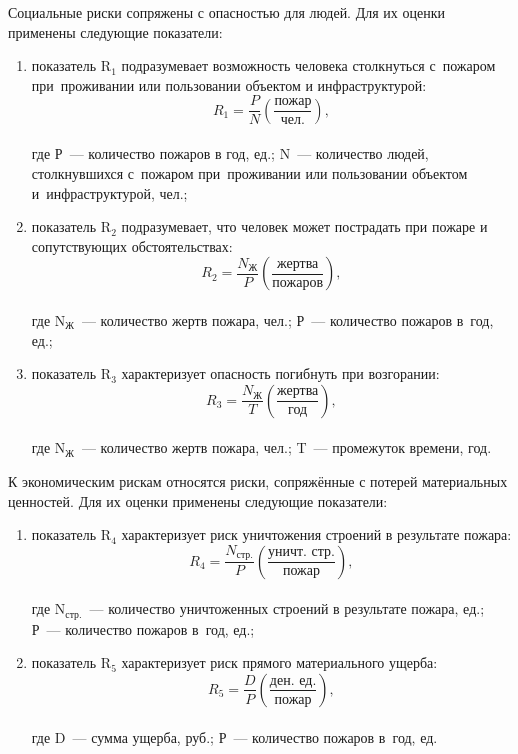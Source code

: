 Социальные риски сопряжены с опасностью для людей. Для их оценки применены следующие показатели:
\begin{enumerate}[noitemsep]\vspace{-8pt}
  \item показатель R$_1$ подразумевает возможность человека столкнуться с~пожаром при~проживании или пользовании объектом и инфраструктурой:\\
  $$R_{1}=\frac{P}{N}\left(\dfrac{\text{пожар}}{\text{чел.}}\right),$$\\
  где Р~--- количество пожаров в год, ед.; N~--- количество людей, столкнувшихся с~пожаром при~проживании или пользовании объектом и~инфраструктурой, чел.;
  \item показатель R$_2$ подразумевает, что человек может пострадать при пожаре и сопутствующих обстоятельствах:\\
  $$R_{2}=\frac{N_\text{Ж}}{P}\left(\dfrac{\text{жертва}}{\text{пожаров}}\right),$$\\
  где N$_\text{Ж}$~--- количество жертв пожара, чел.; Р~--- количество пожаров в~год, ед.;
  \item показатель R$_3$ характеризует опасность погибнуть при возгорании:\\
    $$R_{3}=\frac{N_\text{Ж}}{T}\left(\dfrac{\text{жертва}}{\text{год}}\right),$$\\
    где N$_\text{Ж}$~--- количество жертв пожара, чел.; T~--- промежуток времени, год.
\end{enumerate}
 \vspace{-8pt}
\clearpage
К экономическим рискам относятся риски, сопряжённые с потерей материальных ценностей. Для их оценки применены следующие показатели:
\begin{enumerate}[noitemsep]\vspace{-8pt}
  \item показатель R$_4$ характеризует риск уничтожения строений в результате пожара:\\
  $$R_{4}=\frac{N_\text{стр.}}{P}\left(\dfrac{\text{уничт. стр.}}{\text{пожар}}\right),$$\\
  где N$_\text{стр.}$~---  количество уничтоженных строений в результате пожара, ед.; Р~--- количество пожаров в~год, ед.;
  \item показатель R$_5$ характеризует риск прямого материального ущерба:\\
  $$R_{5}=\frac{D}{P}\left(\dfrac{\text{ден. ед.}}{\text{пожар}}\right),$$\\
    где D~--- сумма ущерба, руб.; Р~--- количество пожаров в~год, ед.
\end{enumerate}
 \vspace{-8pt}

